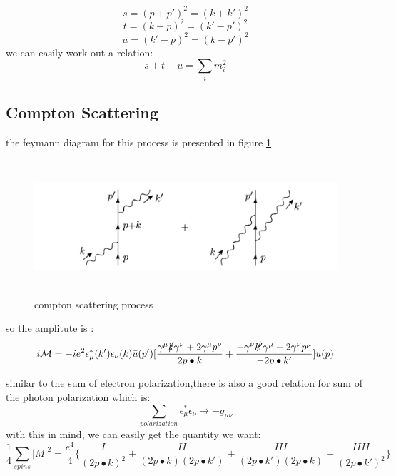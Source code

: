\[s=(p+p')^2=(k+k')^2\]
\[t=(k-p)^2=(k'-p')^2\]
\[u=(k'-p)^2=(k-p')^2\]
we can easily work out a relation:
\[s+t+u=\sum_i m_i^2\]

\subsection{Compton Scattering}
the feymann diagram for this process is presented in figure \ref{fig:compton}\par
\begin{figure}
\begin{center}
\includegraphics[height=5cm]{./figures/compton.PNG}
\caption{compton scattering process}
\label{fig:compton}
\end{center}
\end{figure}
so the amplitute is :
\[i\mathcal{M}=-ie^2\epsilon^*_\mu(k')\epsilon_\nu(k)\bar{u}(p')[\frac{\gamma^\mu\slashed{k}\gamma^\nu+2\gamma^{\mu}p^\nu}{2p\bullet k}+\frac{-\gamma^\nu\slashed{k'}\gamma^\mu+2\gamma^\nu p^\mu}{-2p\bullet k'}]u(p)\]

similar to the sum of electron polarization,there is also a good relation for sum of the photon polarization which is:
\[\sum_{polarization}\epsilon_\mu^*\epsilon_\nu\rightarrow -g_{\mu\nu}\]
with this in mind, we can easily get the quantity we want:
\[\frac{1}{4}\sum_{spins}|M|^2=\frac{e^4}{4}\{\frac{I}{(2p\bullet k)^2}+\frac{II}{(2p\bullet k)(2p\bullet k')}+\frac{III}{(2p\bullet k')(2p\bullet k)}+\frac{IIII}{(2p\bullet k')^2}\}\]

